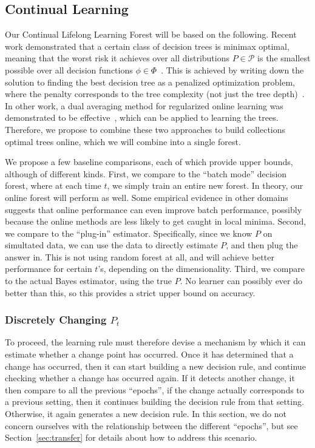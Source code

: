 \documentclass{article}
\begin{document}
\subsection{Continual Learning}

Our Continual Lifelong Learning Forest will be based on the following.  Recent work demonstrated that a certain class of decision trees is minimax optimal, meaning that the worst risk it achieves over all distributions $P \in \mathcal{P}$ is the smallest possible over all decision functions $\phi \in \Phi$~\cite{Scott2006-oo}.  This is achieved by writing down the solution to finding the best decision tree as a penalized optimization problem, where the penalty corresponds to the tree complexity (not just the tree depth)~\cite{Scott2005-ho}. In other work, a dual averaging method for regularized online learning was demonstrated to be effective~\cite{Xiao2010-gv}, which can be applied to learning the trees. Therefore, we propose to combine these two approaches to build collections optimal trees online, which we will combine into a single forest. 

We propose a few baseline comparisons, each of which provide upper bounds, although of different kinds.  First, we compare to the ``batch mode'' decision forest, where at each time $t$, we simply train an entire new forest.  In theory, our online forest will perform as well.  Some empirical evidence in other domains suggests that online performance can even improve batch performance, possibly because the online methods are less likely to get caught in local minima.  Second, we compare to the ``plug-in'' estimator.  Specifically, since we know $P$ on simultated data, we can use the data to directly estimate $P$, and then plug the answer in.  This is not using random forest at all, and will achieve better performance for certain $t$'s, depending on the dimensionality.  Third, we compare to the actual Bayes estimator, using the true $P$.  No learner can possibly ever do better than this, so this provides a strict upper bound on accuracy. 


\subsubsection*{Discretely Changing $P_t$}

To proceed, the learning rule must therefore devise a mechanism by which it can estimate whether a change point has occurred. Once it has determined that a change has occurred, then it can start building a new decision rule, and continue checking whether a change has occurred again.  If it detects another change, it then compare to all the previous ``epochs'', if the change actually corresponds to a previous setting, then it continues building the decision rule from that setting.  Otherwise, it again generates a new decision rule. In this section, we do not concern ourselves with the relationship between the different ``epochs'', but see Section~\ref{sec:transfer} for details about how to address this scenario.   
\end{document}
